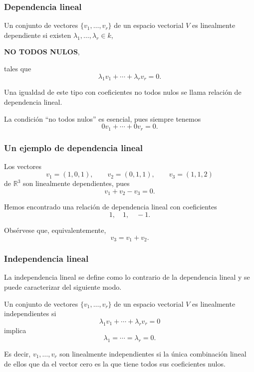 \begin{frame}
    \frametitle{Dependencia lineal}

    \begin{definition}
        Un conjunto de vectores \(\{v_1,\ldots,v_r\}\) de un espacio vectorial \(V\)
        es \alert{linealmente dependiente} si existen
        \(\lambda_1,\ldots,\lambda_r\in k\), 
        \begin{center}  
			\textbf{NO TODOS NULOS}, 
        \end{center}
        tales que
        \[
            \lambda_1v_1+\cdots+\lambda_rv_r=0.
        \]

        Una igualdad de este tipo con coeficientes no todos nulos se llama
        \alert{relación de dependencia lineal}.
    \end{definition}

    \medskip

    La condición ``no todos nulos'' es esencial, pues siempre tenemos
    \[
        0v_1+\cdots+0v_r=0.
    \]
\end{frame}


\begin{frame}
    \frametitle{Un ejemplo de dependencia lineal}

    \begin{example}
        Los vectores
        \[
            v_1=(1,0,1),
            \qquad
            v_2=(0,1,1),
            \qquad
            v_3=(1,1,2)
        \]
        de \(\mathbb{R}^3\) son linealmente dependientes, pues
        \[
            v_1+v_2-v_3=0.
        \]

        Hemos encontrado una relación de dependencia lineal con coeficientes
        \[
            1,\quad 1,\quad -1.
        \]
    \end{example}

    Obsérvese que, equivalentemente,
    \[
        v_3=v_1+v_2.
    \]
\end{frame}


\begin{frame}
    \frametitle{Independencia lineal}
    
    La independencia lineal se define como lo contrario de la dependencia lineal y se puede caracterizar del siguiente modo.

    \begin{definition}
        Un conjunto de vectores \(\{v_1,\ldots,v_r\}\) de un espacio vectorial \(V\)
        es \alert{linealmente independientes} si
        \[
            \lambda_1v_1+\cdots+\lambda_rv_r=0
        \]
        implica
        \[
            \lambda_1=\cdots=\lambda_r=0.
        \]
    \end{definition}

    \medskip

    Es decir, \(v_1,\ldots,v_r\) son linealmente independientes
    si la única combinación lineal de ellos que da el vector cero
    es la que tiene todos sus coeficientes nulos.
\end{frame}


